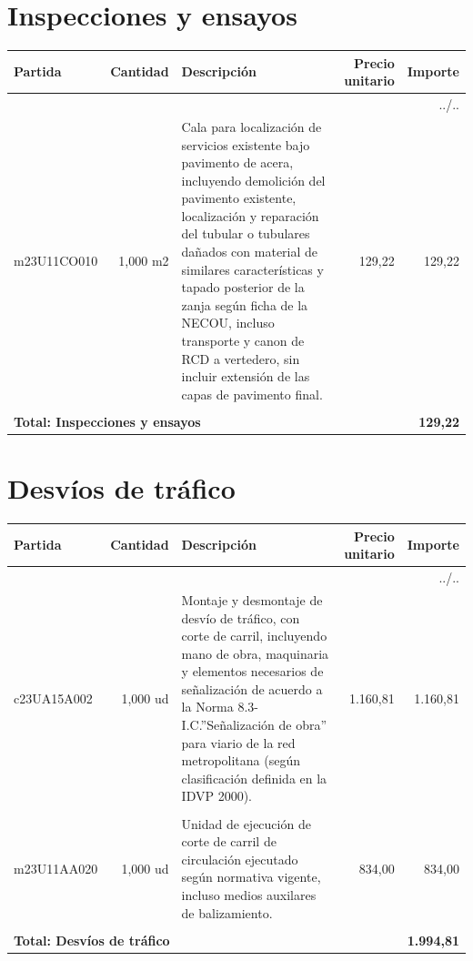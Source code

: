 \documentclass{book}%
\begin{document}
%
\section{Inspecciones y ensayos}%
\small%
\begin{longtable}{lrlrr}%
Partida&Cantidad&Descripción&\multicolumn{1}{p{1.5cm}}{Precio unitario}&Importe\\%
\hline%
\endhead%
\multicolumn{5}{r}{../..}\\%
\endfoot%
\hline%
\endlastfoot%
m23U11CO010&     1,000 m2&\multicolumn{1}{p{5cm}}{Cala para localización de servicios existente bajo pavimento de acera, incluyendo demolición del pavimento existente, localización y reparación del tubular o tubulares dañados con material de similares características y tapado posterior de la zanja según ficha de la NECOU, incluso transporte y canon de RCD a vertedero, sin incluir extensión de las capas de pavimento final.}&    129,22&129,22\\%
&&&&\\%
\multicolumn{4}{p{8cm}}{\textbf{Total: Inspecciones y ensayos}}&\textbf{129,22}\\%
\end{longtable}%
\normalsize

%
\section{Desvíos de tráfico}%
\small%
\begin{longtable}{lrlrr}%
Partida&Cantidad&Descripción&\multicolumn{1}{p{1.5cm}}{Precio unitario}&Importe\\%
\hline%
\endhead%
\multicolumn{5}{r}{../..}\\%
\endfoot%
\hline%
\endlastfoot%
c23UA15A002&     1,000 ud&\multicolumn{1}{p{5cm}}{Montaje y desmontaje de desvío de tráfico, con corte de carril, incluyendo mano de obra, maquinaria y elementos necesarios de señalización de acuerdo a la Norma 8.3{-}I.C.”Señalización de obra” para viario de la red metropolitana (según clasificación definida en la IDVP 2000).}&  1.160,81&1.160,81\\%
&&&&\\%
m23U11AA020&     1,000 ud&\multicolumn{1}{p{5cm}}{Unidad de ejecución de corte de carril de circulación ejecutado según normativa vigente, incluso medios auxilares de balizamiento.}&    834,00&834,00\\%
&&&&\\%
\multicolumn{4}{p{8cm}}{\textbf{Total: Desvíos de tráfico}}&\textbf{1.994,81}\\%
\end{longtable}%
\normalsize
\end{document}
